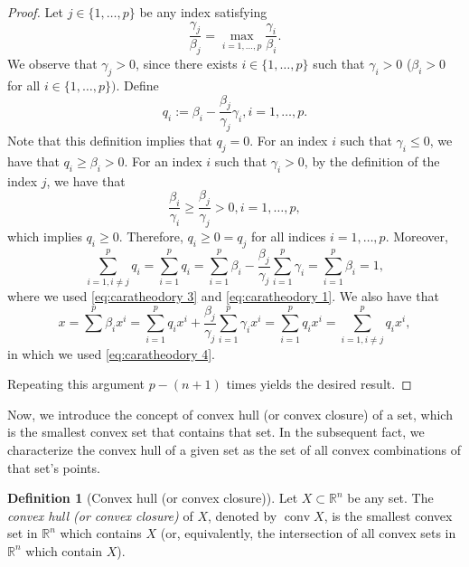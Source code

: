 \documentclass[smallextended,numbook,nospthms]{svjour3}
\theoremstyle{plain}
\theoremstyle{definition}
\newtheorem{definition}[theorem]{Definition}
\def\RR{\mathds R}
\begin{document}
\begin{proof}
	Let $j \in\{1, \ldots, p\}$ be any index satisfying
	\[
	\frac{\gamma_{j}}{\beta_{j}}=\max _{i=1, \ldots, p} \frac{\gamma_{i}}{\beta_{i}}.
	\]
	We observe that $\gamma_{j}>0$, since there exists $i \in\{1, \ldots, p\}$ such that $\gamma_{i}>0$ ($\beta_{i}>0$ for all $i \in\{1, \ldots, p\})$. Define
	\[
	q_{i}:=\beta_{i}-\frac{\beta_{j}}{\gamma_{j}} \gamma_{i}, i=1, \ldots, p.
	\]
	Note that this definition implies that $q_{j}=0$. For an index $i$ such that $\gamma_{i} \leq 0$, we have that $q_{i} \geq \beta_{i}>0$. For an index $i$ such that $\gamma_{i}>0$, by the definition of the index $j$, we have that
	\[
	\frac{\beta_{i}}{\gamma_{i}} \geq \frac{\beta_{j}}{\gamma_{j}}>0, i=1, \ldots, p,
	\]
	which implies $q_{i} \geq 0$. Therefore, $q_{i} \geq 0=q_{j}$ for all indices $i=1, \ldots, p$. Moreover,
	\[
	\sum_{i=1, i \neq j}^{p} q_{i}=\sum_{i=1}^{p} q_{i}=\sum_{i=1}^{p} \beta_{i}-\frac{\beta_{j}}{\gamma_{j}} \sum_{i=1}^{p} \gamma_{i}=\sum_{i=1}^{p} \beta_{i}=1,
	\]
	where we used \cref{eq:caratheodory 3} and \cref{eq:caratheodory 1}.
	We also have that
	\[
	x=\sum^{p} \beta_{i} x^{i}=\sum_{i=1}^{p} q_{i} x^{i}+\frac{\beta_{j}}{\gamma_{j}} \sum_{i=1}^{p} \gamma_{i} x^{i}=\sum_{i=1}^{p} q_{i} x^{i}=\sum_{i=1, i \neq j}^{p} q_{i} x^{i},
	\]
	in which we used \cref{eq:caratheodory 4}. 
	
	Repeating this argument $p-(n+1)$ times yields the desired result.
\end{proof}

Now, we introduce the concept of convex hull (or convex closure) of a set, which is the smallest convex set that contains that set. In the subsequent fact, we characterize the convex hull of a given set as the set of all convex combinations of that set's points.
\begin{definition}[Convex hull (or convex closure)]\label{fact:conv hull}
	Let $X \subset \RR^n$ be any set. The \emph{convex hull (or convex closure)} of $X$, denoted by $\operatorname{conv} X$, is the smallest convex set in $\RR^n$ which contains $X$ (or, equivalently, the intersection of all convex sets in $\RR^n$ which contain $X$).
\end{definition}
\end{document}
